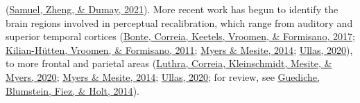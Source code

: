 \documentclass[
  11pt,
  english,
  man,floatsintext]{apa6}
\begin{document}
(\protect\hyperlink{ref-samuel2021}{Samuel, Zheng, \& Dumay, 2021}). More recent work has begun to identify the brain regions involved in perceptual recalibration, which range from auditory and superior temporal cortices (\protect\hyperlink{ref-bonte2017}{Bonte, Correia, Keetels, Vroomen, \& Formisano, 2017}; \protect\hyperlink{ref-kilianhutten2011}{Kilian-Hütten, Vroomen, \& Formisano, 2011}; \protect\hyperlink{ref-myers-mesite2014}{Myers \& Mesite, 2014}; \protect\hyperlink{ref-ullas2020}{Ullas, 2020}), to more frontal and parietal areas (\protect\hyperlink{ref-luthra2020}{Luthra, Correia, Kleinschmidt, Mesite, \& Myers, 2020}; \protect\hyperlink{ref-myers-mesite2014}{Myers \& Mesite, 2014}; \protect\hyperlink{ref-ullas2020}{Ullas, 2020}; for review, see \protect\hyperlink{ref-guediche2014}{Guediche, Blumstein, Fiez, \& Holt, 2014}).
\end{document}
